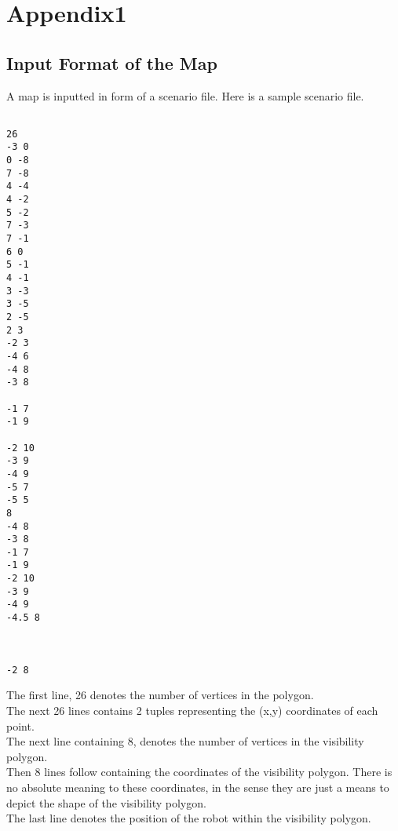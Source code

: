\chapter{Appendix1}

\section{Input Format of the Map}

A map is inputted in form of a scenario file. Here is a sample scenario file.
\begin{verbatim}
 
26
-3 0
0 -8
7 -8
4 -4
4 -2
5 -2
7 -3
7 -1
6 0
5 -1
4 -1
3 -3
3 -5
2 -5
2 3
-2 3
-4 6
-4 8
-3 8

-1 7
-1 9

-2 10
-3 9
-4 9
-5 7
-5 5
8
-4 8
-3 8
-1 7
-1 9
-2 10
-3 9
-4 9
-4.5 8



-2 8

\end{verbatim}

\noindent The first line, 26 denotes the number of vertices in the polygon. \\
The next 26 lines contains 2 tuples representing the (x,y) coordinates of each point. \\
The next line containing 8, denotes the number of vertices in the visibility polygon. \\
Then 8 lines follow containing the coordinates of the visibility polygon. There is no absolute meaning to these 
coordinates, in the sense they are just a means to depict the shape of the visibility polygon.\\
The last line denotes the position of the robot within the visibility polygon.\\




